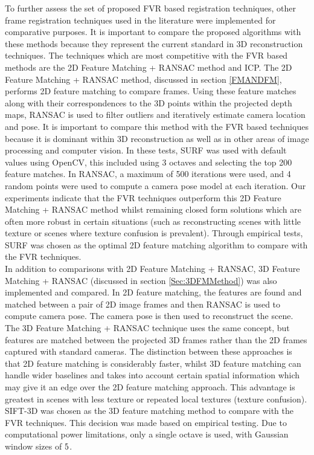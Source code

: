 
To further assess the set of proposed FVR based registration techniques, other frame registration techniques used in the literature were implemented for comparative purposes. It is important to compare the proposed algorithms with these methods because they represent the current standard in 3D reconstruction techniques. The techniques which are most competitive with the FVR based methods are the 2D Feature Matching + RANSAC method and ICP. The 2D Feature Matching + RANSAC method, discussed in section \ref{FMANDFM}, performs 2D feature matching to compare frames. Using these feature matches along with their correspondences to the 3D points within the projected depth maps, RANSAC is used to filter outliers and iteratively estimate camera location and pose. It is important to compare this method with the FVR based techniques because it is dominant within 3D reconstruction as well as in other areas of image processing and computer vision. In these tests, SURF was used with default values using OpenCV, this included using 3 octaves and selecting the top 200 feature matches. In RANSAC, a maximum of 500 iterations were used, and 4 random points were used to compute a camera pose model at each iteration. Our experiments indicate that the FVR techniques outperform this 2D Feature Matching + RANSAC method whilst remaining closed form solutions which are often more robust in certain situations (such as reconstructing scenes with little texture or scenes where texture confusion is prevalent). Through empirical tests, SURF was chosen as the optimal 2D feature matching algorithm to compare with the FVR techniques. \\ 


In addition to comparisons with 2D Feature Matching + RANSAC, 3D Feature Matching + RANSAC (discussed in section \ref{Sec:3DFMMethod}) was also implemented and compared. In 2D feature matching, the features are found and matched between a pair of 2D image frames and then RANSAC is used to compute camera pose. The camera pose is then used to reconstruct the scene. The 3D Feature Matching + RANSAC technique uses the same concept, but features are matched between the projected 3D frames rather than the 2D frames captured with standard cameras. The distinction between these approaches is that 2D feature matching is considerably faster, whilst 3D feature matching can handle wider baselines and takes into account certain spatial information which may give it an edge over the 2D feature matching approach. This advantage is greatest in scenes with less texture or repeated local textures (texture confusion). SIFT-3D was chosen as the 3D feature matching method to compare with the FVR techniques. This decision was made based on empirical testing. Due to computational power limitations, only a single octave is used, with Gaussian window sizes of $5 \time 5$. \\

